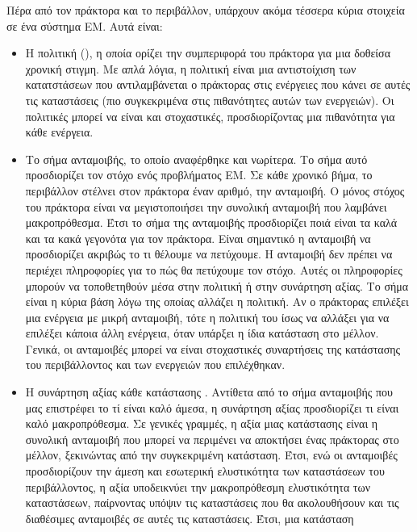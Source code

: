 Πέρα από τον πράκτορα και το περιβάλλον, υπάρχουν ακόμα τέσσερα κύρια στοιχεία σε ένα σύστημα ΕΜ. Αυτά είναι:
\begin{itemize}
    \item Η πολιτική (), η οποία ορίζει την συμπεριφορά του πράκτορα για μια δοθείσα
          χρονική στιγμη. Με απλά λόγια, η πολιτική είναι μια αντιστοίχιση των κατατστάσεων
          που αντιλαμβάνεται ο πράκτορας στις ενέργειες που κάνει σε αυτές τις καταστάσεις (πιο συγκεκριμένα στις πιθανότητες αυτών των ενεργειών). Οι
          πολιτικές μπορεί να είναι και στοχαστικές, προσδιορίζοντας μια πιθανότητα για κάθε ενέργεια.
    \item Το σήμα ανταμοιβής, το οποίο αναφέρθηκε και νωρίτερα. Το σήμα αυτό προσδιορίζει τον στόχο ενός προβλήματος
          ΕΜ. Σε κάθε χρονικό βήμα, το περιβάλλον στέλνει στον πράκτορα έναν αριθμό, την ανταμοιβή.
          Ο μόνος στόχος του πράκτορα είναι να μεγιστοποιήσει την συνολική ανταμοιβή που λαμβάνει
          μακροπρόθεσμα. Έτσι το σήμα της ανταμοιβής προσδιορίζει	ποιά είναι τα καλά και τα κακά
          γεγονότα για τον πράκτορα. Είναι σημαντικό η ανταμοιβή να προσδιορίζει ακριβώς το
          τι θέλουμε να πετύχουμε. Η ανταμοιβή δεν πρέπει να περιέχει πληροφορίες
          για το πώς θα πετύχουμε τον στόχο. Αυτές οι πληροφορίες μπορούν να τοποθετηθούν μέσα στην πολιτική ή στην συνάρτηση αξίας.
          Το σήμα είναι η κύρια βάση λόγω της οποίας αλλάζει η πολιτική.
          Αν ο πράκτορας επιλέξει μια ενέργεια με μικρή ανταμοιβή, τότε η πολιτική του ίσως να αλλάξει
          για να επιλέξει κάποια άλλη ενέργεια, όταν υπάρξει η ίδια κατάσταση στο μέλλον. Γενικά, οι
          ανταμοιβές μπορεί να είναι στοχαστικές συναρτήσεις της κατάστασης του περιβάλλοντος και των
          ενεργειών που επιλέχθηκαν.
    \item Η συνάρτηση αξίας κάθε κατάστασης . Αντίθετα από το σήμα
          ανταμοιβής που μας επιστρέφει το τί είναι καλό άμεσα, η συνάρτηση αξίας προσδιορίζει τι είναι καλό μακροπρόθεσμα.
          Σε γενικές γραμμές, η αξία μιας κατάστασης είναι η συνολική ανταμοιβή που μπορεί να περιμένει
          να αποκτήσει ένας πράκτορας στο μέλλον, ξεκινώντας από την συγκεκριμένη κατάσταση. Έτσι,
          ενώ οι ανταμοιβές προσδιορίζουν την άμεση και εσωτερική ελυστικότητα των καταστάσεων του περιβάλλοντος,
          η αξία υποδεικνύει την μακροπρόθεσμη ελυστικότητα των καταστάσεων, παίρνοντας υπόψιν τις καταστάσεις
          που θα ακολουθήσουν και τις διαθέσιμες ανταμοιβές σε αυτές τις καταστάσεις. Έτσι, μια κατάσταση

\end{itemize}
